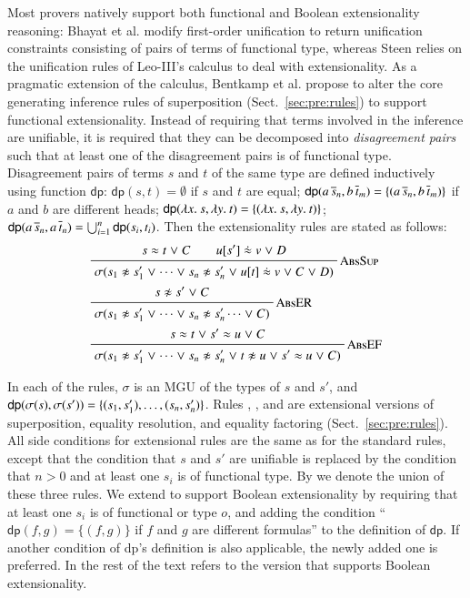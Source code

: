 Most provers natively support both functional and Boolean extensionality
reasoning: Bhayat et al. \cite{br-20-full-sup-w-combs} modify first-order
unification to return unification constraints consisting of pairs of terms of
functional type, whereas Steen relies on the unification rules of Leo-III's
calculus \cite[Sect.~4.3.3]{as-18-phd} to deal with extensionality. As a
pragmatic extension of the \lsup{} calculus, Bentkamp et al.
\cite{bbtvw-21-sup-lam} propose to alter the core generating inference rules of
superposition (Sect.~\ref{sec:pre:rules}) to support functional extensionality.
Instead of requiring that terms involved in the inference are unifiable, it is
required that they can be decomposed into \emph{disagreement pairs} such that at
least one of the disagreement pairs is of functional type. Disagreement pairs of
terms $s$ and $t$ of the same type are defined inductively using function
$\textsf{dp}$: $\textsf{dp}(s,t) = \emptyset$ if $s$ and $t$ are equal;
$\textsf{dp}(a \, \overline{s}_{n}, b \, \overline{t}_{m}) = \{(a \, \overline{s}_{n}, b \,
\overline{t}_{m})\}$ if $a$ and $b$ are different heads; $\textsf{dp}(\lambda x.\> s,
\lambda y.\> t) = \{ (\lambda x.\> s, \lambda y.\> t) \}$; $\textsf{dp}(a \, \overline{s}_{n}, a
\, \overline{t}_{n}) = \bigcup_{i=1}^{n} \textsf{dp}(s_i, t_i)$. Then the
extensionality rules are stated as follows:
\pagebreak[2]
\begin{align*}
  & \namedinference{AbsSup}
  {s \eq t \llor C \qquad u[s'] \mathrel{\dot{\eq}} v \llor D}
  {\sigmacl{s_1 \noteq s'_1 \llor \cdots \llor s_n \noteq s'_n \llor  u[t] \mathrel{\dot{\eq}} v \llor C \llor D}} \\
  &\namedinference{AbsER}{s \noteq s' \llor C}{\sigmacl{s_1 \noteq s'_1 \llor \cdots \llor s_n \noteq s'_n \cdots \llor  C}} \\
  &\namedinference{AbsEF}{s \eq t \llor  s' \eq u \llor C}{\sigmacl{s_1 \noteq s'_1 \llor \cdots \llor s_n \noteq s'_n \llor t \noteq u \llor  s' \eq u \llor C}}
\end{align*}

\noindent{}
In each of the rules, $\sigma$ is an MGU of the types of $s$ and
$s'$, and $\textsf{dp}(\sigma(s) ,\sigma(s')) = \{ (s_1, s'_1), \ldots,\allowbreak
(s_n, s'_n)\}$. Rules , , and  are
extensional versions of superposition, equality resolution, and equality
factoring (Sect.~\ref{sec:pre:rules}). All side conditions for extensional rules are the same as for
the standard rules, except that the condition that $s$ and $s'$ are unifiable is
replaced by the condition that $n>0$ and at least one $s_i$ is of functional type. By  we denote the union of
these three rules. We extend  to support Boolean extensionality by
requiring that at least one $s_i$ is of functional or type $o$, and adding the
condition ``$\textsf{dp}(f, g) = \{(f,g)\}$ if $f$ and $g$ are different
formulas'' to the definition of $\textsf{dp}$. If another condition of \textsf{dp}'s 
definition is also applicable, the newly added one is preferred. In the rest of the
text  refers to the version that supports Boolean extensionality.

